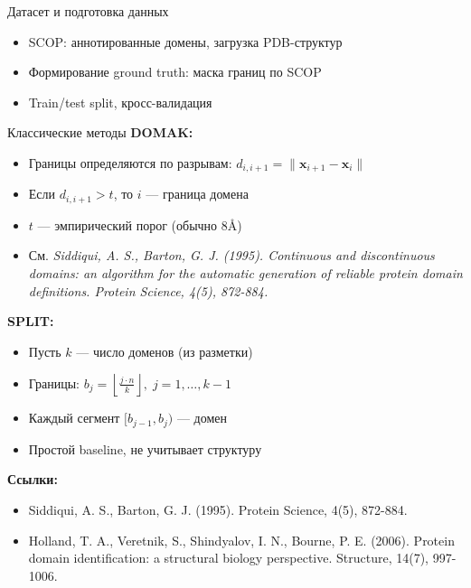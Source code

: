 \documentclass{beamer}
\begin{document}
\begin{frame}{Датасет и подготовка данных}
  \begin{itemize}
    \item SCOP: аннотированные домены, загрузка PDB-структур
    \item Формирование ground truth: маска границ по SCOP
    \item Train/test split, кросс-валидация
  \end{itemize}
\end{frame}

\begin{frame}{Классические методы}
  \textbf{DOMAK:}
  \begin{itemize}
    \item Границы определяются по разрывам: $d_{i,i+1} = \|\mathbf{x}_{i+1} - \mathbf{x}_i\|$
    \item Если $d_{i,i+1} > t$, то $i$ — граница домена
    \item $t$ — эмпирический порог (обычно 8\AA)
    \item См. \textit{Siddiqui, A. S., Barton, G. J. (1995). Continuous and discontinuous domains: an algorithm for the automatic generation of reliable protein domain definitions. Protein Science, 4(5), 872-884.}
  \end{itemize}
  \vspace{0.5em}
  \textbf{SPLIT:}
  \begin{itemize}
    \item Пусть $k$ — число доменов (из разметки)
    \item Границы: $b_j = \left\lfloor \frac{j \cdot n}{k} \right\rfloor,\; j=1,\ldots,k-1$
    \item Каждый сегмент $[b_{j-1}, b_j)$ — домен
    \item Простой baseline, не учитывает структуру
  \end{itemize}
  \vspace{0.5em}
  \textbf{Ссылки:}
  \begin{itemize}
    \item \footnotesize Siddiqui, A. S., Barton, G. J. (1995). Protein Science, 4(5), 872-884.
    \item \footnotesize Holland, T. A., Veretnik, S., Shindyalov, I. N., Bourne, P. E. (2006). Protein domain identification: a structural biology perspective. Structure, 14(7), 997-1006.
  \end{itemize}
\end{frame}
\end{document}
